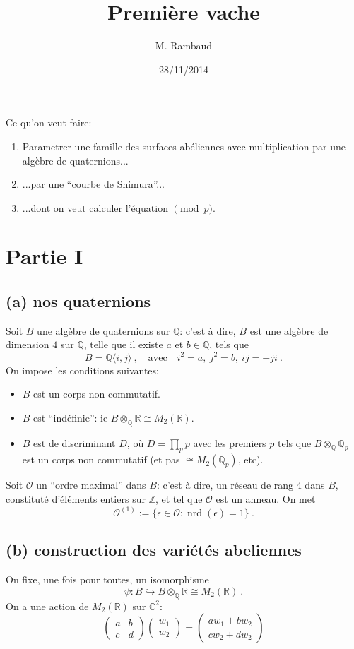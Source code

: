 \documentclass[a4paper]{article}
\title{Première vache}
\author{M. Rambaud}
\date{28/11/2014}
\newcommand{\CC}{\mathbb{C}}
\newcommand{\QQ}{\mathbb{Q}}
\newcommand{\RR}{\mathbb{R}}
\newcommand{\ZZ}{\mathbb{Z}}
\newcommand{\OO}{\mathcal{O}}
\DeclareMathOperator*{\nrd}{nrd}
\newcommand{\cvtwo}[2]{{\left(\begin{array}{c}{#1}\\ {#2}\end{array}\right)}}
\newcommand{\mtwo}[4]{{\left(\begin{array}{cc}{#1} & {#2} \\ {#3} & {#4}\end{array}\right)}}
\begin{document}
\maketitle

Ce qu'on veut faire:
\begin{enumerate}
    \item
        Parametrer une famille des surfaces abéliennes avec
        multiplication par une algèbre de quaternions...
    \item
        ...par une ``courbe de Shimura''...
    \item
        ...dont on veut calculer l'équation \(\pmod{p}\).
\end{enumerate}

\section{%
    Partie I
}%

\subsection*{(a) nos quaternions}
Soit \(B\)  une algèbre de quaternions sur \(\QQ\): c'est à dire,
\(B\) est une algèbre de dimension \(4\) sur \(\QQ\), telle que il existe
\(a\) et \(b\in\QQ\), tels que 
\[
    B = \QQ\langle i,j\rangle
    \ ,
    \quad \text{avec}\quad
    i^2 = a,
    \ 
    j^2 = b,
    \ 
    ij = -ji
    \ .
\]
On impose les conditions suivantes:
\begin{itemize}
    \item \(B\) est un corps non commutatif.
    \item \(B\) est ``indéfinie'': ie \(B\otimes_\QQ\RR \cong M_2(\RR)\).
    \item \(B\) est de discriminant \(D\), 
        où \(D = \prod_{p}p\) avec les premiers \(p\)
        tels que \(B\otimes_\QQ \QQ_p\) est un corps non commutatif
        (et pas \(\cong M_2(\QQ_p)\), etc).
\end{itemize}
Soit \(\OO\) un ``ordre maximal''
dans \(B\): c'est à dire, un réseau de rang \(4\) dans \(B\),
constituté d'éléments entiers sur \(\ZZ\), et tel que \(\OO\)
est un anneau.
On met
\[
    \OO^{(1)} 
    := 
    \{ \epsilon \in \OO : \nrd(\epsilon) = 1 \}
    \ .
\]

\subsection*{(b) construction des variétés abeliennes}
On fixe, une fois pour toutes, un isomorphisme
\[
    \psi: B \hookrightarrow B\otimes_\QQ\RR \cong M_2(\RR)
    \ .
\]
On a une action de \(M_2(\RR)\) sur \(\CC^2\):
\[
    \mtwo{a}{b}{c}{d} \cvtwo{w_1}{w_2}
    =
    \cvtwo{aw_1 + bw_2}{cw_2 + dw_2}
\]
\end{document}
